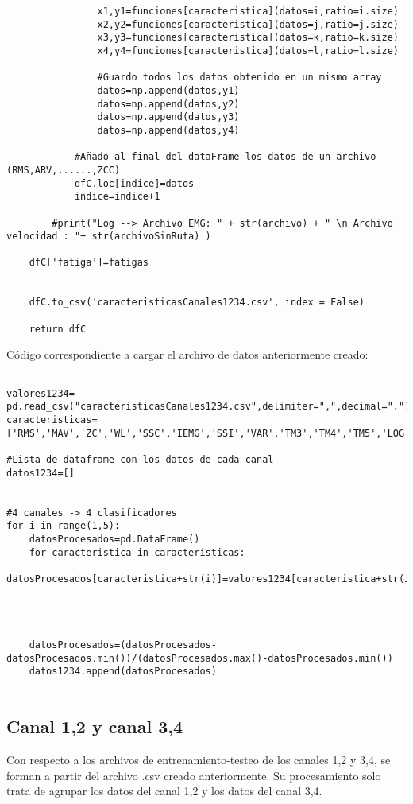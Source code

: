 \begin{lstlisting}
                x1,y1=funciones[caracteristica](datos=i,ratio=i.size)
                x2,y2=funciones[caracteristica](datos=j,ratio=j.size)
                x3,y3=funciones[caracteristica](datos=k,ratio=k.size)
                x4,y4=funciones[caracteristica](datos=l,ratio=l.size)

                #Guardo todos los datos obtenido en un mismo array 
                datos=np.append(datos,y1)
                datos=np.append(datos,y2)
                datos=np.append(datos,y3)
                datos=np.append(datos,y4)
        
            #Añado al final del dataFrame los datos de un archivo (RMS,ARV,......,ZCC)
            dfC.loc[indice]=datos
            indice=indice+1
      
        #print("Log --> Archivo EMG: " + str(archivo) + " \n Archivo velocidad : "+ str(archivoSinRuta) )
        
    dfC['fatiga']=fatigas
              
    
    dfC.to_csv('caracteristicasCanales1234.csv', index = False)
    
    return dfC
    \end{lstlisting}
    
    
    
    Código correspondiente a cargar el archivo de datos anteriormente creado:
    \begin{lstlisting}
    
valores1234= pd.read_csv("caracteristicasCanales1234.csv",delimiter=",",decimal=".")
caracteristicas=['RMS','MAV','ZC','WL','SSC','IEMG','SSI','VAR','TM3','TM4','TM5','LOG','ACC','MNF','MDF']

#Lista de dataframe con los datos de cada canal
datos1234=[]


#4 canales -> 4 clasificadores
for i in range(1,5):
    datosProcesados=pd.DataFrame()
    for caracteristica in caracteristicas:
        datosProcesados[caracteristica+str(i)]=valores1234[caracteristica+str(i)]
        
        
    
    
    datosProcesados=(datosProcesados-datosProcesados.min())/(datosProcesados.max()-datosProcesados.min())
    datos1234.append(datosProcesados)


    \end{lstlisting}
    
    \subsection{Canal 1,2 y canal 3,4}
    Con respecto a los archivos de entrenamiento-testeo de los canales 1,2 y 3,4, se forman a partir del archivo .csv creado anteriormente. Su procesamiento solo trata de agrupar los datos del canal 1,2 y los datos del canal 3,4.
    
